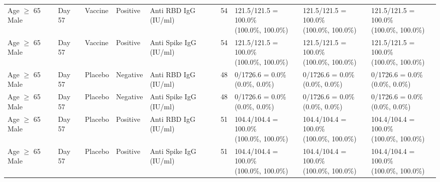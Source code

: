 \documentclass[]{book}
\theoremstyle{definition}
\theoremstyle{definition}
\theoremstyle{definition}
\newcommand{\1}{\mathbbm{1}}
\begin{document}
\begin{landscape}
\begin{ThreePartTable}
\begin{longtable}[t]{>{\raggedright\arraybackslash}p{2.7cm}llllllll}
\hspace{1em}Age $\geq$ 65 Male & Day 57 & Vaccine & Positive & Anti RBD IgG (IU/ml) & 54 & \makecell[l]{121.5/121.5 = 100.0\%\\(100.0\%, 100.0\%)} & \makecell[l]{121.5/121.5 = 100.0\%\\(100.0\%, 100.0\%)} & \makecell[l]{121.5/121.5 = 100.0\%\\(100.0\%, 100.0\%)}\\
\hspace{1em}Age $\geq$ 65 Male & Day 57 & Vaccine & Positive & Anti Spike IgG (IU/ml) & 54 & \makecell[l]{121.5/121.5 = 100.0\%\\(100.0\%, 100.0\%)} & \makecell[l]{121.5/121.5 = 100.0\%\\(100.0\%, 100.0\%)} & \makecell[l]{121.5/121.5 = 100.0\%\\(100.0\%, 100.0\%)}\\
\hspace{1em}Age $\geq$ 65 Male & Day 57 & Placebo & Negative & Anti RBD IgG (IU/ml) & 48 & \makecell[l]{0/1726.6 = 0.0\%\\(0.0\%, 0.0\%)} & \makecell[l]{0/1726.6 = 0.0\%\\(0.0\%, 0.0\%)} & \makecell[l]{0/1726.6 = 0.0\%\\(0.0\%, 0.0\%)}\\
\hspace{1em}Age $\geq$ 65 Male & Day 57 & Placebo & Negative & Anti Spike IgG (IU/ml) & 48 & \makecell[l]{0/1726.6 = 0.0\%\\(0.0\%, 0.0\%)} & \makecell[l]{0/1726.6 = 0.0\%\\(0.0\%, 0.0\%)} & \makecell[l]{0/1726.6 = 0.0\%\\(0.0\%, 0.0\%)}\\
\hspace{1em}Age $\geq$ 65 Male & Day 57 & Placebo & Positive & Anti RBD IgG (IU/ml) & 51 & \makecell[l]{104.4/104.4 = 100.0\%\\(100.0\%, 100.0\%)} & \makecell[l]{104.4/104.4 = 100.0\%\\(100.0\%, 100.0\%)} & \makecell[l]{104.4/104.4 = 100.0\%\\(100.0\%, 100.0\%)}\\
\hspace{1em}Age $\geq$ 65 Male & Day 57 & Placebo & Positive & Anti Spike IgG (IU/ml) & 51 & \makecell[l]{104.4/104.4 = 100.0\%\\(100.0\%, 100.0\%)} & \makecell[l]{104.4/104.4 = 100.0\%\\(100.0\%, 100.0\%)} & \makecell[l]{104.4/104.4 = 100.0\%\\(100.0\%, 100.0\%)}\\

\end{longtable}
\end{ThreePartTable}
\end{landscape}
\end{document}
